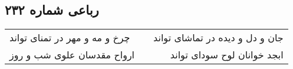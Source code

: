 \begin{center}
\section*{رباعی شماره ۲۳۲}
\label{sec:sh232}
\begin{longtable}{l p{0.5cm} r}
چرخ و مه و مهر در تمنای تواند
&&
جان و دل و دیده در تماشای تواند
\\
ارواح مقدسان علوی شب و روز
&&
ابجد خوانان لوح سودای تواند
\\
\end{longtable}
\end{center}
